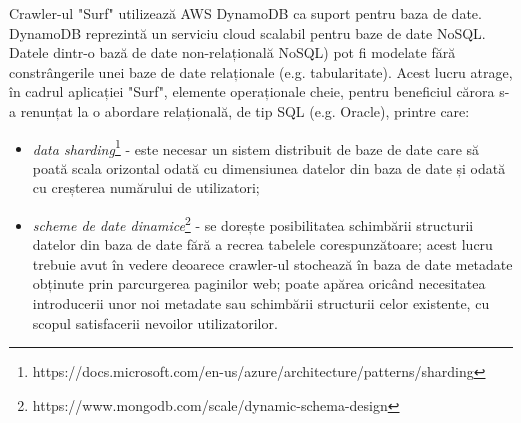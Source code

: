 \noindent
Crawler-ul "Surf" utilizează AWS DynamoDB ca suport pentru baza de date. DynamoDB reprezintă un serviciu cloud scalabil pentru baze de date NoSQL. Datele dintr-o bază de date non-relațională NoSQL) pot fi modelate fără constrângerile unei baze de date relaționale (e.g. tabularitate). Acest lucru atrage, în cadrul aplicației "Surf", elemente operaționale cheie, pentru beneficiul cărora s-a renunțat la o abordare relațională, de tip SQL (e.g. Oracle), printre care:


\begin{itemize}

	\item{\emph{data sharding}\footnote{https://docs.microsoft.com/en-us/azure/architecture/patterns/sharding} - este necesar un sistem distribuit de baze de date care să poată scala orizontal odată cu dimensiunea datelor din baza de date și odată cu creșterea numărului de utilizatori;}
	\item{\emph{scheme de date dinamice}\footnote{https://www.mongodb.com/scale/dynamic-schema-design} - se dorește posibilitatea schimbării structurii datelor din baza de date fără a recrea tabelele corespunzătoare; acest lucru trebuie avut în vedere deoarece crawler-ul stochează în baza de date metadate obținute prin parcurgerea paginilor web; poate apărea oricând necesitatea introducerii unor noi metadate sau schimbării structurii celor existente, cu scopul satisfacerii nevoilor utilizatorilor.}
	
\end{itemize}

